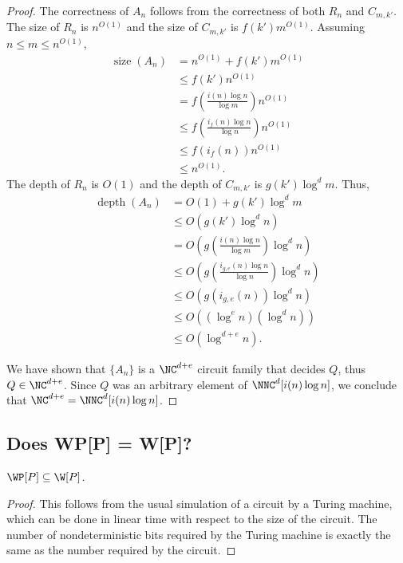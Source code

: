 \documentclass{article}
\DeclareMathOperator{\depth}{depth}
\DeclareMathOperator{\size}{size}
\begin{document}
\begin{proof}
  The correctness of $A_n$ follows from the correctness of both $R_n$ and $C_{m, k'}$.
  The size of $R_n$ is $n^{O(1)}$ and the size of $C_{m, k'}$ is $f(k') m^{O(1)}$.
  Assuming $n \leq m \leq n^{O(1)}$,
  \begin{align*}
    \size(A_n) & = n^{O(1)} + f(k') m^{O(1)} \\
    & \leq f(k') n^{O(1)} \\
    & = f\left(\frac{i(n) \log n}{\log m}\right) n^{O(1)} \\
    & \leq f\left(\frac{i_f(n) \log n}{\log n}\right) n^{O(1)} \\
    & \leq f(i_f(n)) n^{O(1)} \\
    & \leq n^{O(1)}.
  \end{align*}
  The depth of $R_n$ is $O(1)$ and the depth of $C_{m, k'}$ is $g(k') \log^d m$.
  Thus,
  \begin{align*}
    \depth(A_n) & = O(1) + g(k') \log^d m \\
    & \leq O(g(k') \log^d n) \\
    & = O(g\left(\frac{i(n) \log n}{\log m}\right) \log^d n) \\
    & \leq O(g\left(\frac{i_{g, e}(n) \log n}{\log n}\right) \log^d n) \\
    & \leq O(g(i_{g, e}(n)) \log^d n) \\
    & \leq O((\log^e n)(\log^d n)) \\
    & \leq O(\log^{d + e} n).
  \end{align*}

  We have shown that $\{A_n\}$ is a $\NC^{d + e}$ circuit family that decides $Q$, thus $Q \in \NC^{d + e}$.
  Since $Q$ was an arbitrary element of $\NNC^d[i(n) \log n]$, we conclude that $\NC^{d + e} = \NNC^d[i(n) \log n]$.
\end{proof}

\subsection{Does WP[P] = W[P]?}

\begin{theorem}
  $\WP[P] \subseteq \W[P]$.
\end{theorem}
\begin{proof}
  This follows from the usual simulation of a circuit by a Turing machine, which can be done in linear time with respect to the size of the circuit.
  The number of nondeterministic bits required by the Turing machine is exactly the same as the number required by the circuit.
\end{proof}
\end{document}
